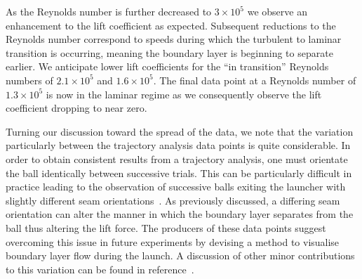 \documentclass[a4paper]{article}
\begin{document}
As the Reynolds number is further decreased to $3 \times 10^{5}$ we observe an enhancement to the lift coefficient as expected.  Subsequent reductions to the Reynolds number correspond to speeds during which the turbulent to laminar transition is occurring, meaning the boundary layer is beginning to separate earlier.  We anticipate lower lift coefficients for the ``in transition'' Reynolds numbers of $2.1 \times 10^{5}$ and $1.6 \times 10^{5}$.  The final data point at a Reynolds number of $1.3 \times 10^{5}$ is now in the laminar regime as we consequently observe the lift coefficient dropping to near zero.

Turning our discussion toward the spread of the data, we note that the variation particularly between the trajectory analysis data points is quite considerable.  In order to obtain consistent results from a trajectory analysis, one must orientate the ball identically between successive trials.  This can be particularly difficult in practice leading to the observation of successive balls exiting the launcher with slightly different seam orientations~\cite{JEGoff}.  As previously discussed, a differing seam orientation can alter the manner in which the boundary layer separates from the ball thus altering the lift force.  The producers of these data points suggest overcoming this issue in future experiments by devising a method to visualise boundary layer flow during the launch.  A discussion of other minor contributions to this variation can be found in reference~\cite{JEGoff}.
\end{document}
